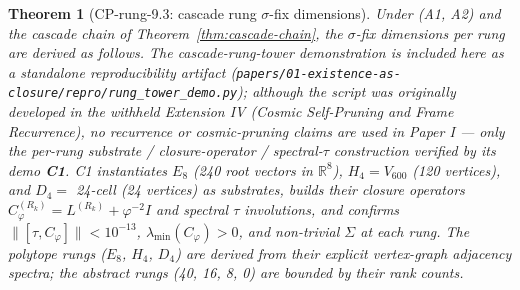 \documentclass[11pt]{article}
\theoremstyle{plain}
\newtheorem{theorem}{Theorem}[section]
\theoremstyle{definition}
\theoremstyle{remark}
\newcommand{\Cph}{C_\varphi}
\begin{document}
\begin{theorem}[CP-rung-9.3: cascade rung $\sigma$-fix dimensions]\label{thm:cp-rung-9-3}
Under (A1, A2) and the cascade chain of Theorem~\ref{thm:cascade-chain}, the $\sigma$-fix dimensions per rung are derived as follows. The cascade-rung-tower demonstration is included here as a standalone reproducibility artifact (\texttt{papers/01-existence-as-closure/repro/rung\_tower\_demo.py}); although the script was originally developed in the withheld Extension IV (\emph{Cosmic Self-Pruning and Frame Recurrence}), no recurrence or cosmic-pruning claims are used in Paper I --- only the per-rung substrate / closure-operator / spectral-$\tau$ construction verified by its demo \textbf{C1}. C1 instantiates $E_8$ (240 root vectors in $\mathbb{R}^8$), $H_4 = V_{600}$ (120 vertices), and $D_4 =$ 24-cell (24 vertices) as substrates, builds their closure operators $\Cph^{(R_k)} = L^{(R_k)} + \varphi^{-2} I$ and spectral $\tau$ involutions, and confirms $\|[\tau, \Cph]\| < 10^{-13}$, $\lambda_{\min}(\Cph) > 0$, and non-trivial $\Sigma$ at each rung. The polytope rungs ($E_8$, $H_4$, $D_4$) are derived from their explicit vertex-graph adjacency spectra; the abstract rungs (40, 16, 8, 0) are bounded by their rank counts.


\end{theorem}
\end{document}

